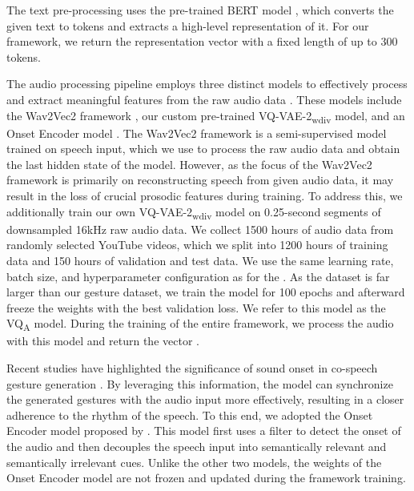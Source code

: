 \documentclass[sigconf]{acmart}
\begin{document}
The text pre-processing uses the pre-trained BERT model \cite{devlinBERTPretrainingDeep2019}, which converts the given text  to tokens and extracts a high-level representation of it. For our framework, we return the representation vector with a fixed length of up to 300 tokens.

The audio processing pipeline employs three distinct models to effectively process and extract meaningful features from the raw audio data . These models include the Wav2Vec2 framework \cite{baevskiWav2vecFrameworkSelfSupervised2020}, our custom pre-trained VQ-VAE-2\textsubscript{wdiv} model, and an Onset Encoder model \cite{liangSEEGSemanticEnergized2022}.
The Wav2Vec2 framework is a semi-supervised model trained on speech input, which we use to process the raw audio data and obtain the last hidden state of the model. However, as the focus of the Wav2Vec2 framework is primarily on reconstructing speech from given audio data, it may result in the loss of crucial prosodic features during training. To address this, we additionally train our own VQ-VAE-2\textsubscript{wdiv} model on 0.25-second segments of downsampled 16kHz raw audio data. We collect 1500 hours of audio data from randomly selected YouTube videos, which we split into 1200 hours of training data and 150 hours of validation and test data. We use the same learning rate, batch size, and hyperparameter configuration as for the . As the dataset is far larger than our gesture dataset, we train the model for 100 epochs and afterward freeze the weights with the best validation loss. We refer to this model as the VQ\textsubscript{A} model. During the training of the entire framework, we process the audio with this model and return the vector .

Recent studies have highlighted the significance of sound onset in co-speech gesture generation \cite{liangSEEGSemanticEnergized2022,aoRhythmicGesticulatorRhythmAware2022a}. By leveraging this information, the model can synchronize the generated gestures with the audio input more effectively, resulting in a closer adherence to the rhythm of the speech. To this end, we adopted the Onset Encoder model proposed by \citet{liangSEEGSemanticEnergized2022}. This model first uses a filter to detect the onset of the audio and then decouples the speech input into semantically relevant and semantically irrelevant cues. Unlike the other two models, the weights of the Onset Encoder model are not frozen and updated during the framework training. 
\end{document}
